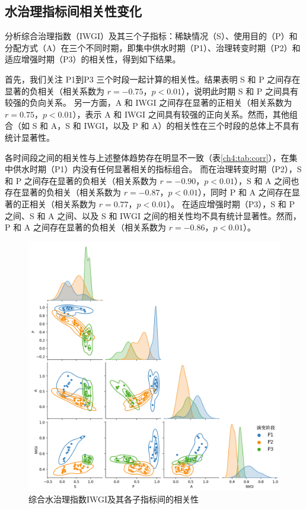 
\subsection{水治理指标间相关性变化}

分析综合治理指数（IWGI）及其三个子指标：稀缺情况（S）、使用目的（P）和分配方式（A）在三个不同时期，即集中供水时期（P1）、治理转变时期（P2）和适应增强时期（P3）的相关性，得到如下结果。

首先，我们关注 P1到P3 三个时段一起计算的相关性。结果表明 S 和 P 之间存在显著的负相关（相关系数为 $r = -0.75$，$p < 0.01$），说明此时期 S 和 P 之间具有较强的负向关系。
另一方面，A 和 IWGI 之间存在显著的正相关（相关系数为 $r = 0.75$，$p < 0.01$），表示 A 和 IWGI 之间具有较强的正向关系。然而，其他组合（如 S 和 A，S 和 IWGI，以及 P 和 A）的相关性在三个时段的总体上不具有统计显著性。

各时间段之间的相关性与上述整体趋势存在明显不一致（表\ref{ch4:tab:corr}），在集中供水时期（P1）内没有任何显著相关的指标组合。
而在治理转变时期（P2），S 和 P 之间存在显著的负相关（相关系数为 $r = -0.90$，$p < 0.01$），S 和 A 之间也存在显著的负相关（相关系数为 $r = -0.87$，$p < 0.01$），同时 P 和 A 之间存在显著的正相关（相关系数为 $r = 0.77$，$p < 0.01$）。
在适应增强时期（P3），S 和 P 之间、S 和 A 之间、以及 S 和 IWGI 之间的相关性均不具有统计显著性。然而，P 和 A 之间存在显著的负相关（相关系数为 $r = -0.86$，$p < 0.01$）。

\begin{figure}[htb]
    \centering
    \includegraphics[width=\textwidth]{img/ch4/ch4_correlation.png}
    \caption{综合水治理指数IWGI及其各子指标间的相关性}\label{ch4:fig:corr}
\end{figure}

